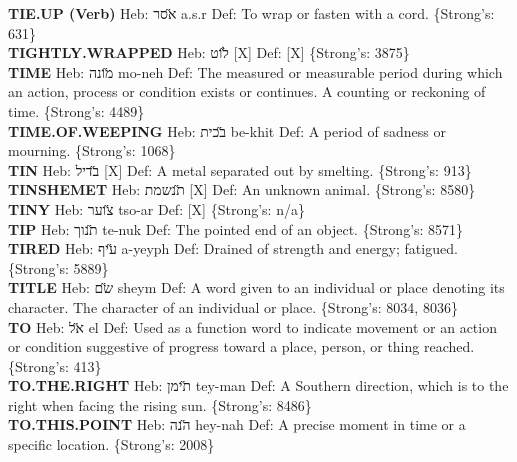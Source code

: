 {\textbf{TIE.UP (Verb)} Heb: {\large\H אסר} a.s.r Def: To wrap or fasten with a cord. \{Strong's: 631\}\hfill{}\\

\textbf{TIGHTLY.WRAPPED} Heb: {\large\H לוט} {[}X{]} Def: {[}X{]} \{Strong's: 3875\}\hfill{}\\

\textbf{TIME} Heb: {\large\H מונה} mo-neh Def: The measured or measurable period during which an action, process or condition exists or continues. A counting or reckoning of time. \{Strong's: 4489\}\hfill{}\\

\textbf{TIME.OF.WEEPING} Heb: {\large\H בכית} be-khit Def: A period of sadness or mourning. \{Strong's: 1068\}\hfill{}\\

\textbf{TIN} Heb: {\large\H בדיל} {[}X{]} Def: A metal separated out by smelting. \{Strong's: 913\}\hfill{}\\

\textbf{TINSHEMET} Heb: {\large\H תנשמת} {[}X{]} Def: An unknown animal. \{Strong's: 8580\}\hfill{}\\

\textbf{TINY} Heb: {\large\H צוער} tso-ar Def: {[}X{]} \{Strong's: n/a\}\hfill{}\\

\textbf{TIP} Heb: {\large\H תנוך} te-nuk Def: The pointed end of an object. \{Strong's: 8571\}\hfill{}\\

\textbf{TIRED} Heb: {\large\H עיף} a-yeyph Def: Drained of strength and energy; fatigued. \{Strong's: 5889\}\hfill{}\\

\textbf{TITLE} Heb: {\large\H שם} sheym Def: A word given to an individual or place denoting its character. The character of an individual or place. \{Strong's: 8034, 8036\}\hfill{}\\

\textbf{TO} Heb: {\large\H אל} el Def: Used as a function word to indicate movement or an action or condition suggestive of progress toward a place, person, or thing reached. \{Strong's: 413\}\hfill{}\\

\textbf{TO.THE.RIGHT} Heb: {\large\H תימן} tey-man Def: A Southern direction, which is to the right when facing the rising sun. \{Strong's: 8486\}\hfill{}\\

\textbf{TO.THIS.POINT} Heb: {\large\H הנה} hey-nah Def: A precise moment in time or a specific location. \{Strong's: 2008\}\hfill{}\\

}
